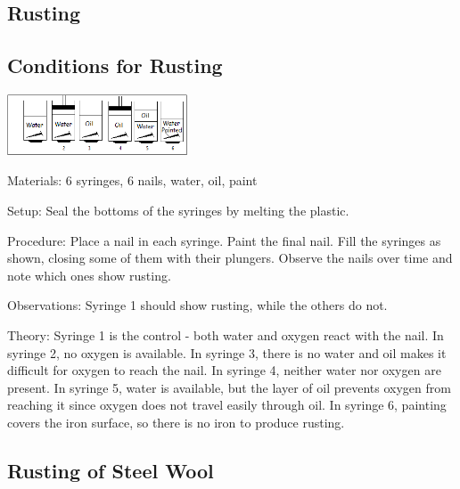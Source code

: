 \begin{multicols}{2}
\section*{Rusting} 


\subsection{Conditions for Rusting}

\begin{center}
\includegraphics[width=0.4\textwidth]{./img/rusting-nails-6.png}
\end{center}

\begin{description*}
\item[Materials:]{6 syringes, 6 nails, water, oil, paint}
\item[Setup:]{Seal the bottoms of the syringes by melting the plastic.}
\item[Procedure:]{Place a nail in each syringe. Paint the final nail. Fill the syringes as shown, closing some of them with their plungers. Observe the nails over time and note which ones show rusting.}
\item[Observations:]{Syringe 1 should show rusting, while the others do not.}
\item[Theory:]{Syringe 1 is the control - both water and oxygen react with the nail. In syringe 2, no oxygen is available. In syringe 3, there is no water and oil makes it difficult for oxygen to reach the nail. In syringe 4, neither water nor oxygen are present. In syringe 5, water is available, but the layer of oil prevents oxygen from reaching it since oxygen does not travel easily through oil. In syringe 6, painting covers the iron surface, so there is no iron to produce rusting.}
\end{description*}

\subsection{Rusting of Steel Wool} %


\end{multicols}

